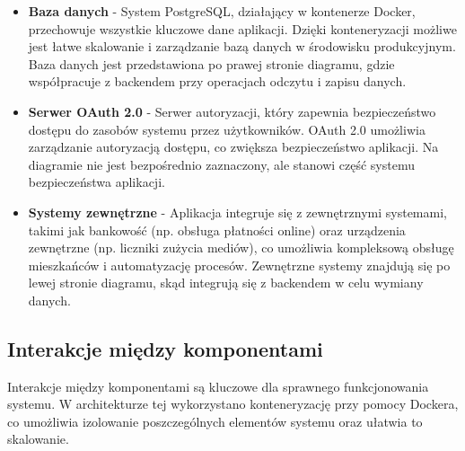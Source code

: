 \begin{itemize}
	\item \textbf{Baza danych} - System PostgreSQL, działający w kontenerze Docker, przechowuje wszystkie kluczowe dane aplikacji. Dzięki konteneryzacji możliwe jest łatwe skalowanie i zarządzanie bazą danych w środowisku produkcyjnym. Baza danych jest przedstawiona po prawej stronie diagramu, gdzie współpracuje z backendem przy operacjach odczytu i zapisu danych.

	\item \textbf{Serwer OAuth 2.0} - Serwer autoryzacji, który zapewnia bezpieczeństwo dostępu do zasobów systemu przez użytkowników. OAuth 2.0 umożliwia zarządzanie autoryzacją dostępu, co zwiększa bezpieczeństwo aplikacji. Na diagramie nie jest bezpośrednio zaznaczony, ale stanowi część systemu bezpieczeństwa aplikacji.

	\item \textbf{Systemy zewnętrzne} - Aplikacja integruje się z zewnętrznymi systemami, takimi jak bankowość (np. obsługa płatności online) oraz urządzenia zewnętrzne (np. liczniki zużycia mediów), co umożliwia kompleksową obsługę mieszkańców i automatyzację procesów. Zewnętrzne systemy znajdują się po lewej stronie diagramu, skąd integrują się z backendem w celu wymiany danych.


\end{itemize}

\subsection{Interakcje między komponentami}

Interakcje między komponentami są kluczowe dla sprawnego funkcjonowania systemu. W architekturze tej wykorzystano konteneryzację przy pomocy Dockera, co umożliwia izolowanie poszczególnych elementów systemu oraz ułatwia to skalowanie.

